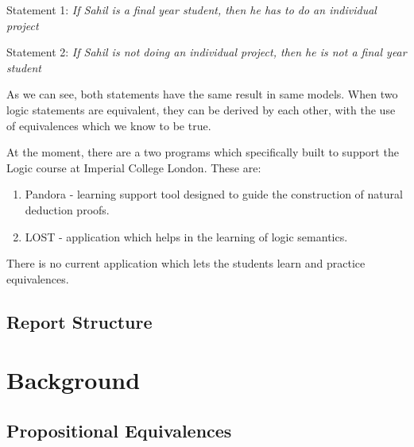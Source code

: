 \documentclass[11pt]{article}
\begin{document}
Statement 1: \emph{If Sahil is a final year student, 
then he has to do an individual project} \\ \bigskip 

Statement 2: \emph{If Sahil is not 
doing an individual project, then he is not a final year student} \\ \bigskip 

As we can see, both statements have the same result in same models. When two logic 
statements are equivalent, they can be derived by each other, with the use of 
equivalences which we know to be true.

At the moment, there are a two programs which specifically built to support the
Logic course at Imperial College London. These are:
\begin{enumerate}
  \item Pandora - learning support tool designed to guide the construction of
         natural deduction proofs. 
  \item LOST - application which helps in the learning of logic semantics.
\end{enumerate}

There is no current application which lets the students learn and practice
equivalences. 

\subsection{Report Structure}
\newpage

\section{Background}

\subsection{Propositional Equivalences}
\end{document}
